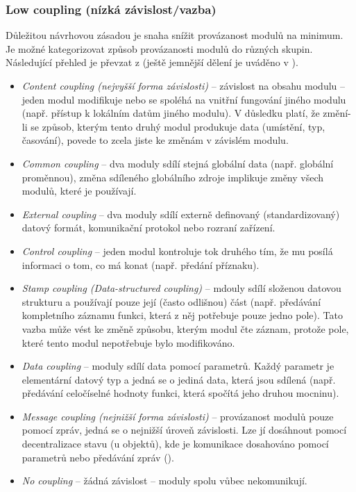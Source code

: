 \subsubsection{Low coupling (nízká závislost/vazba)}
Důležitou návrhovou zásadou je snaha snížit provázanost modulů na minimum. Je možné kategorizovat způsob provázanosti modulů do různých skupin. Následující přehled je převzat z \cite{wiki:coupling} (ještě jemnější dělení je uváděno v \cite{STVR:STVR162}).

\begin{itemize}
\item\emph{Content coupling (nejvyšší forma závislosti)} -- závislost na obsahu modulu -- jeden modul modifikuje nebo se spoléhá na vnitřní fungování jiného modulu (např. přístup k lokálním datům jiného modulu). V důsledku platí, že změní-li se způsob, kterým tento druhý modul produkuje data (umístění, typ, časování), povede to zcela jiste ke změnám v závislém modulu.
\item\emph{Common coupling} -- dva moduly sdílí stejná globální data (např. globální proměnnou), změna sdíleného globálního zdroje implikuje změny všech modulů, které je používají.
\item\emph{External coupling} -- dva moduly sdílí externě definovaný (standardizovaný) datový formát, komunikační protokol nebo rozraní zařízení.
\item\emph{Control coupling} -- jeden modul kontroluje tok druhého tím, že mu posílá informaci o tom, co má konat (např. předání  příznaku).
\item\emph{Stamp coupling (Data-structured coupling)} -- mdouly sdílí složenou datovou strukturu a používají pouze její (často odlišnou) část (např. předávání kompletního záznamu funkci, která z něj potřebuje pouze jedno pole). Tato vazba může vést ke změně způsobu, kterým modul čte záznam, protože pole, které tento modul nepotřebuje bylo modifikováno.
\item\emph{Data coupling} -- moduly sdílí data pomocí parametrů. Každý parametr je elementární datový typ a jedná se o jediná data, která jsou sdílená (např. předávání celočíselné hodnoty funkci, která spočítá jeho druhou mocninu).
\item\emph{Message coupling (nejnižší forma závislosti)} -- provázanost modulů pouze pomocí zpráv, jedná se o nejnižší úroveň závislosti. Lze jí dosáhnout pomocí decentralizace stavu (u objektů), kde je komunikace dosahováno pomocí parametrů nebo předávání zpráv ().
\item\emph{No coupling} -- žádná závislost -- moduly spolu vůbec nekomunikují.
\end{itemize}

